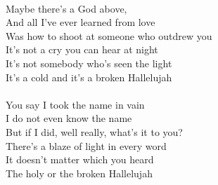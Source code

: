 \documentclass[a5paper, 10pt]{book}
\begin{document}
\begin{minipage}[t]{0.8\textwidth}
  \\
  Maybe there's a God above,\\
  And all I've ever learned from love\\
  Was how to shoot at someone who outdrew you\\
  It's not a cry you can hear at night\\
  It's not somebody who's seen the light\\
  It's a cold and it's a broken Hallelujah\\
  \\
  You say I took the name in vain\\
  I do not even know the name\\
  But if I did, well really, what's it to you?\\
  There's a blaze of light in every word\\
  It doesn't matter which you heard\\
  The holy or the broken Hallelujah\\
\end{minipage}
\end{document}
